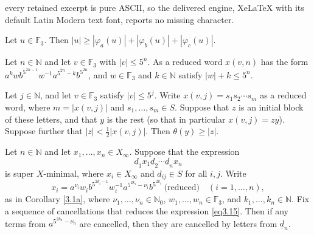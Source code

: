 \documentclass[10pt,a4paper]{amsart}
\newcommand {\N}{\mathbb N}
\newcommand{\F}{\mathbb F}
\newcommand{\pdt}{\underline}
\begin{document}
every retained excerpt is pure ASCII, so the delivered engine, XeLaTeX with its default Latin Modern text font, reports no missing character.
	\begin{lemma} 	\label{3.0}
		Let $u \in \F_3$. Then $|u| \geq |\varphi_a(u)| + |\varphi_b(u)| + |\varphi_c(u)|.$
	\end{lemma}

	\begin{corollary}		\label{3.1a}
		Let $n \in \N$ and let $v \in \F_3$ with $|v| \leq 5^n$. As a reduced word $x(v,n)$ has the form
		$a^k w b^{5^{2n-1}} w^{-1} a^{5^{2n}-k}b^{5^{2n}}$, and  $w \in \F_3$ and $k \in \N$ satisfy $|w|+k \leq 5^n$. 
	\end{corollary}

	\begin{lemma}		\label{3.6}
		Let $j \in \N$, and let $v \in \F_3$ satisfy $|v| \leq 5^j$. Write 
		$x(v,j) = s_1s_2 \cdots s_m$ as a reduced word, where $m = |x(v,j)|$ and $s_1, \ldots, s_m \in S$.
		Suppose that $z$ is an initial block of these letters, and that $y$ is the rest (so that in particular $x(v,j) = zy$).
		Suppose further that $|z| < \frac{1}{2} |x(v,j)|$. Then $\theta(y) \geq |z|$. 
	\end{lemma}

	\begin{lemma}		\label{3.7} 
		Let $n \in \N$ and let $x_1, \ldots, x_n \in X_\infty$. Suppose that the expression
		\begin{equation}	\label{eq3.15}
			\pdt{d}_1x_1 \pdt{d}_2 \cdots \pdt{d}_n x_n
		\end{equation}
		is super $X$-minimal, where $x_i \in X_\infty$ and $d_{ij} \in S$ for all $i,j$. Write 
		$$x_i = a^{\nu_i}w_ib^{5^{2k_i-1}}w_i^{-1}a^{5^{2k_i} - \nu_i}b^{5^{2k_i}} \ \text{(reduced)} \quad (i = 1, \ldots, n),$$
		as in Corollary \ref{3.1a}, where $\nu_1, \ldots, \nu_n \in \N_0$, $w_1, \ldots, w_n \in \F_3$, and $k_1, \ldots, k_n \in \N$.			
		Fix a sequence of cancellations that reduces the expression \eqref{eq3.15}.
		Then if any terms from $a^{5^{2k_n} - \nu_n}$ are cancelled, then they are cancelled by letters from $\pdt{d}_n$.	
	\end{lemma}
\end{document}
